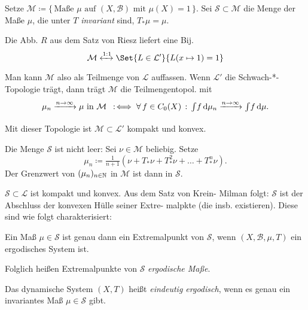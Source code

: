 \documentclass{cheat-sheet}
\newcommand{\Bor}{\mathcal{B}} %
\newcommand{\meST}{$(X, \Bor, \mu, T)$} %
\newcommand{\Lin}{\mathcal{L}} %
\newcommand{\Meas}{\mathcal{M}} %
\begin{document}
\begin{defn}
  Setze $\Meas \coloneqq \{ \, \text{Maße $\mu$ auf $(X, \Bor)$ mit $\mu(X) = 1$} \, \}$.
  Sei $\mathcal{S} \subset \Meas$ die Menge der Maße $\mu$, die unter $T$ \emph{invariant} sind, \dh{} $T_* \mu = \mu$.
\end{defn}

\begin{kor}
  Die Abb. $R$ aus dem Satz von Riesz liefert eine Bij.
  \[ \Meas \xleftrightarrow{1:1} \Set{L \in \Lin'}{L(x \mapsto 1) = 1} \]
\end{kor}

\begin{bem}
  Man kann $\Meas$ also als Teilmenge von $\mathcal{L}$ auffassen.
  Wenn $\Lin'$ die Schwach-*-Topologie trägt, dann trägt $\Meas$ die Teilmengentopol. mit
  \[
    \mu_n \xrightarrow{n \to \infty} \mu \text{ in $\Meas$} \coloniff
    \fa{f \in C_0(X)} \Int{}{}{f}{\mu_n} \xrightarrow{n \to \infty} \Int{}{}{f}{\mu}.
  \]
  Mit dieser Topologie ist $\Meas \subset \Lin'$ kompakt und konvex.
\end{bem}

\begin{bem}
  Die Menge $\mathcal{S}$ ist nicht leer: Sei $\nu \in \Meas$ beliebig. Setze
  \[ \mu_n \coloneqq \tfrac{1}{n+1} \left( \nu + T_* \nu + T^2_* \nu + \ldots + T^n_* \nu \right). \]
  Der Grenzwert von $(\mu_n)_{n \in \mathbb{N}}$ in $\Meas$ ist dann in $\mathcal{S}$.
\end{bem}

\begin{bem}
  $\mathcal{S} \subset \Lin$ ist kompakt und konvex. Aus dem Satz von Krein- Milman folgt: $\mathcal{S}$ ist der Abschluss der konvexen Hülle seiner Extre- malpkte (die insb. existieren). Diese sind wie folgt charakterisiert:
\end{bem}

\begin{prop}
  Ein Maß $\mu \in \mathcal{S}$ ist genau dann ein Extremalpunkt von $\mathcal{S}$, wenn \meST{} ein ergodisches System ist.
\end{prop}

\begin{bem}
  Folglich heißen Extremalpunkte von $\mathcal{S}$ \emph{ergodische Maße}.
\end{bem}

\begin{defn}
  Das dynamische System $(X, T)$ heißt \emph{eindeutig ergodisch}, wenn es genau ein invariantes Maß $\mu \in \mathcal{S}$ gibt.
\end{defn}
\end{document}
